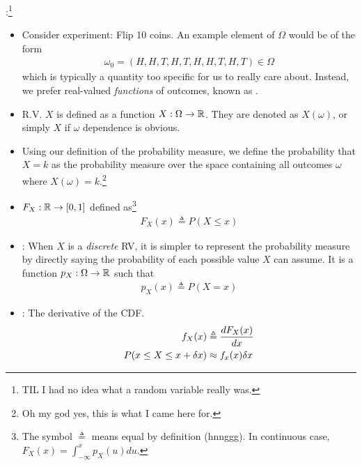 \documentclass[12pt]{article}
\newcommand{\myspace}{\vspace{2\bigskipamount}}
\newcommand\p{\Needspace{10\baselineskip} \noindent}
\begin{document}
\myspace
\p {}:\footnote{TIL I had no idea what a random variable really was.}\vspace{-1em}
\begin{itemize}[--]
	\item Consider experiment: Flip 10 coins. An example element of $\Omega$ would be of the form 
	\begin{align}
	\omega_0 = (H, H, T, H, T, H, H, T, H, T) \in \Omega
	\end{align}
	which is typically a quantity too specific for us to really care about. Instead, we prefer real-valued \textit{functions} of outcomes, known as . 
	\item R.V. $X$ is defined as a function $X: \Omega \rightarrow \mathbb{R}$. They are denoted as $X(\omega)$, or simply $X$ if $\omega$ dependence is obvious. 
	\item Using our definition of the probability measure, we define the probability that $X = k$ as the probability measure over the space containing all outcomes $\omega$ where $X(\omega) = k$.\footnote{Oh my god yes, this is what I came here for.} 
	
	\item {} $F_X : \mathbb{R} \rightarrow [0, 1]$ defined as\footnote{The symbol $\triangleq$ means equal by definition (hnnggg). In continuous case, $F_X(x) = \int_{-\infty}^{x} p_X(u) du$.}
	\begin{align}
	F_X(x) \triangleq P(X \le x)
	\end{align}
	
	\item {}: When $X$ is a \textit{discrete} RV, it is simpler to represent the probability measure by directly saying the probability of each possible value $X$ can assume. It is a function $p_X : \Omega \rightarrow \mathbb{R}$ such that 
	\begin{align}
	p_X (x) \triangleq P(X = x)
	\end{align}
	
	\item {}: The derivative of the CDF. 
	\begin{align}
	f_X (x) &\triangleq \frac{dF_X(x)}{dx} \\
	P(x \le X \le x + \delta x) &\approx f_x(x) \delta x
	\end{align}
\end{itemize}
\end{document}
